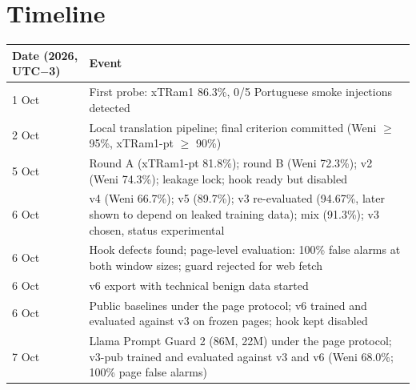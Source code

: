 \documentclass[11pt]{article}
\begin{document}
\section{Timeline}\label{app:C}

\begin{center}
\small
\begin{tabularx}{\linewidth}{@{}l>{\raggedright\arraybackslash\hsize=1.00\hsize}X@{}}
\toprule
Date (2026, UTC\ensuremath{-}3) & Event \\
\midrule
1 Oct & First probe: xTRam1 86.3\%, 0/5 Portuguese smoke injections detected %
 \\
2 Oct & Local translation pipeline; final criterion committed (Weni \ensuremath{\geq} 95\%, xTRam1-pt \ensuremath{\geq} 90\%) %
 \\
5 Oct & Round A (xTRam1-pt 81.8\%); round B (Weni 72.3\%); v2 (Weni 74.3\%); leakage lock; hook ready but disabled %
 \\
6 Oct & v4 (Weni 66.7\%); v5 (89.7\%); v3 re-evaluated (94.67\%, later shown to depend on leaked training data); mix (91.3\%); v3 chosen, status experimental %
 \\
6 Oct & Hook defects found; page-level evaluation: 100\% false alarms at both window sizes; guard rejected for web fetch %
 \\
6 Oct & v6 export with technical benign data started %
 \\
6 Oct & Public baselines under the page protocol; v6 trained and evaluated against v3 on frozen pages; hook kept disabled %
 \\
7 Oct & Llama Prompt Guard 2 (86M, 22M) under the page protocol; v3-pub trained and evaluated against v3 and v6 (Weni 68.0\%; 100\% page false alarms) %
 \\
\bottomrule
\end{tabularx}
\end{center}
\end{document}
